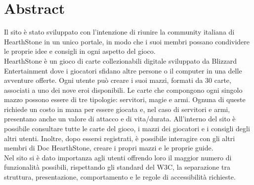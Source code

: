 \section{Abstract}
Il sito è stato sviluppato con l'intenzione di riunire la community italiana di HearthStone in un unico portale, in modo che i suoi membri possano condividere le proprie idee e consigli in ogni aspetto del gioco. \\
HearthStone è un gioco di carte collezionabili digitale sviluppato da Blizzard Entertainment dove i giocatori sfidano altre persone o il computer in una delle avventure offerte.
Ogni utente può creare i suoi mazzi, formati da 30 carte, associati a uno dei nove eroi disponibili.
Le carte che compongono ogni singolo mazzo possono essere di tre tipologie: servitori, magie e armi. Ognuna di queste richiede un costo in mana per essere giocata e, nel caso di servitori e armi, presentano anche un valore di attacco e di vita/durata.
All'interno del sito è possibile consultare tutte le carte del gioco, i mazzi dei giocatori e i consigli degli altri utenti. Inoltre, dopo essersi registrati, è possibile interagire con gli altri membri di Doc HearthStone, creare i propri mazzi e le proprie guide.\\
Nel sito si è dato importanza agli utenti offrendo loro il maggior numero di funzionalità possibili, rispettando gli standard del W3C, la separazione tra struttura, presentazione, comportamento e le regole di accessibilità richieste.
\newpage